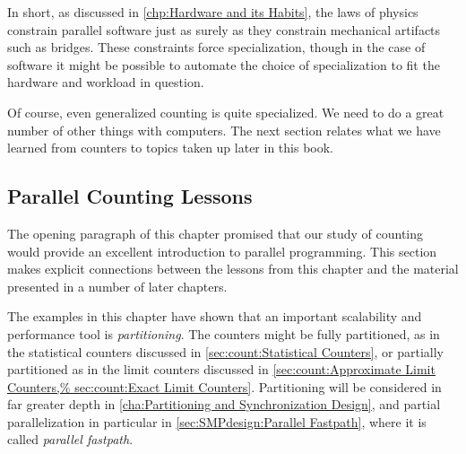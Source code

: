 In short, as discussed in
\cref{chp:Hardware and its Habits},
the laws of physics constrain parallel software just as surely as they
constrain mechanical artifacts such as bridges.
These constraints force specialization, though in the case of software
it might be possible to automate the choice of specialization to
fit the hardware and workload in question.

Of course, even generalized counting is quite specialized.
We need to do a great number of other things with computers.
The next section relates what we have learned from counters to
topics taken up later in this book.

\subsection{Parallel Counting Lessons}
\label{sec:count:Parallel Counting Lessons}

The opening paragraph of this chapter promised that our study of counting
would provide an excellent introduction to parallel programming.
This section makes explicit connections between the lessons from
this chapter and the material presented in a number of later chapters.

The examples in this chapter have shown that an important scalability
and performance tool is \emph{partitioning}.
The counters might be fully partitioned, as in the statistical counters
discussed in \cref{sec:count:Statistical Counters},
or partially partitioned as in the limit counters discussed in
\cref{sec:count:Approximate Limit Counters,%
sec:count:Exact Limit Counters}.
Partitioning will be considered in far greater depth in
\cref{cha:Partitioning and Synchronization Design},
and partial parallelization in particular in
\cref{sec:SMPdesign:Parallel Fastpath}, where it is called
\emph{parallel fastpath}.

